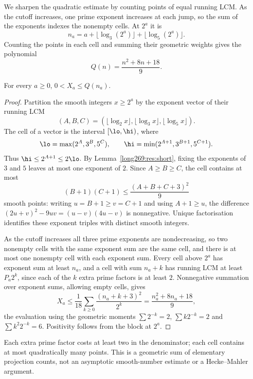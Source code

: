 We sharpen the quadratic estimate by counting points of equal running LCM.
As the cutoff increases, one prime exponent increases at each jump, so
the sum of the exponents indexes the nonempty cells. At $2^a$ it is
\[
 n_a=a+\lfloor\log_3(2^a)\rfloor+\lfloor\log_5(2^a)\rfloor.
\]
Counting the points in each cell and summing their geometric weights
gives the polynomial
\[
 Q(n)=\frac{n^2+8n+18}{9}.
\]

\begin{theorem}\label{long269:res:actual-tail-bound}
For every $a\ge0$, $0<X_a\le Q(n_a)$.
\end{theorem}

\begin{proof}
Partition the smooth integers $x\ge2^{a}$ by the exponent vector of their running LCM
\[
 (A,B,C)=(\lfloor\log_2x\rfloor,\lfloor\log_3x\rfloor,\lfloor\log_5x\rfloor).
\]
The cell of a vector is the interval $[\lo,\hi)$, where
\[
 \lo=\max(2^{A},3^{B},5^{C}),\qquad
 \hi=\min(2^{A+1},3^{B+1},5^{C+1}).
\]
Thus $\hi\le2^{A+1}\le2\lo$.  By Lemma~\ref{long269:res:short}, fixing the
exponents of $3$ and $5$ leaves at most one exponent of $2$.  Since $A\ge B\ge C$, the cell
contains at most
\[
 (B+1)(C+1)\le\frac{(A+B+C+3)^{2}}{9}
\]
smooth points: writing $u=B+1\ge v=C+1$ and using $A+1\ge u$, the difference
$(2u+v)^{2}-9uv=(u-v)(4u-v)$ is nonnegative.  Unique factorisation identifies
these exponent triples with distinct smooth integers.

As the cutoff increases all three prime exponents are nondecreasing, so two
nonempty cells with the same exponent sum are the same cell, and there is at most one nonempty cell with each exponent sum.  Every cell above
$2^a$ has exponent sum at least $n_a$, and a cell with sum $n_a+k$ has
running LCM at least $P_a2^k$,
since each of the $k$ extra prime factors is at least $2$.  Nonnegative summation over exponent sums, allowing empty cells, gives
\[
 X_a\le\frac1{18}\sum_{k\ge0}\frac{(n_a+k+3)^{2}}{2^{k}}
      =\frac{n_a^{2}+8n_a+18}{9},
\]
the evaluation using the geometric moments $\sum2^{-k}=2$, $\sum k2^{-k}=2$
and $\sum k^{2}2^{-k}=6$.  Positivity follows from the block at $2^{a}$.
\end{proof}

Each extra prime factor costs at least two in the denominator; each
cell contains at most quadratically many points. This is a geometric
sum of elementary projection counts, not an asymptotic smooth-number
estimate or a Hecke--Mahler argument.

